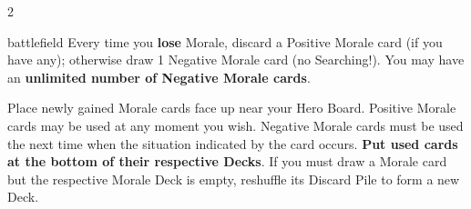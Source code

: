 \begin{multicols*}{2}
\begin{expansion}[before=\vspace*{-11mm}]{battlefield}
\smallskip
Every time you \textbf{lose} Morale, discard a Positive Morale card (if you have any); otherwise draw 1 Negative Morale card (no Searching!).
You may have an \textbf{unlimited number of Negative Morale cards}.

\smallskip
Place newly gained Morale cards face up near your Hero Board.
Positive Morale cards may be used at any moment you wish.
Negative Morale cards must be used the next time when the situation indicated by the card occurs.
\textbf{Put used cards at the bottom of their respective Decks}.
If you must draw a Morale card but the respective Morale Deck is empty, reshuffle its Discard Pile to form a new Deck.
\end{expansion}
\end{multicols*}
